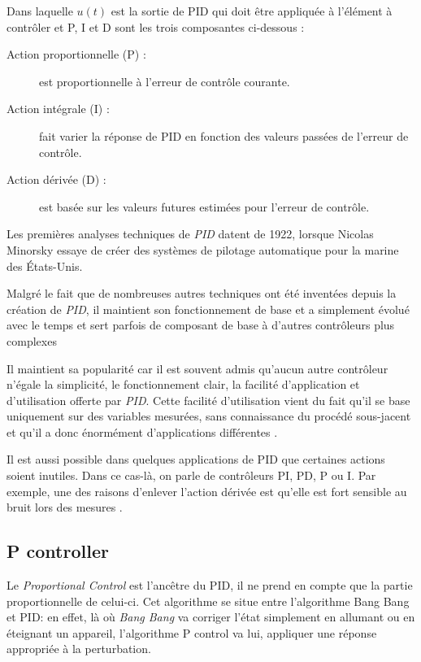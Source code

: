 \documentclass[a4paper,10pt]{report}
\begin{document}
Dans laquelle $u(t)$ est la sortie de PID qui doit être appliquée à l'élément à contrôler et P, I et D sont les trois composantes ci-dessous :
\begin{description} %
\item[Action proportionnelle (P) :]
    est proportionnelle à l'erreur de contrôle courante.
\item[Action intégrale (I) :]
    fait varier la réponse de PID en fonction des valeurs passées de l'erreur de contrôle.
\item[Action dérivée (D) :]
    est basée sur les valeurs futures estimées pour l'erreur de contrôle.
\end{description}

Les premières analyses techniques de \emph{PID} datent de 1922, lorsque Nicolas Minorsky essaye de créer des systèmes de pilotage automatique pour la marine des États-Unis. \cite{minorsky1922directional}

Malgré le fait que de nombreuses autres techniques ont été inventées depuis la création de \emph{PID}, il maintient son fonctionnement de base et a simplement évolué avec le temps et sert parfois de composant de base à d'autres contrôleurs plus complexes \cite{ang2005pid} \cite{visioli2006practical}

Il maintient sa popularité car il est souvent admis qu'aucun autre contrôleur n'égale la simplicité, le fonctionnement clair, la facilité d'application et d'utilisation offerte par \emph{PID}. Cette facilité d'utilisation vient du fait qu'il se base uniquement sur des variables mesurées, sans connaissance du procédé sous-jacent et qu'il a donc énormément d'applications différentes \cite{bennett1993history}.

Il est aussi possible dans quelques applications de PID que certaines actions soient inutiles.
Dans ce cas-là, on parle de contrôleurs PI, PD, P ou I.
Par exemple, une des raisons d'enlever l'action dérivée est qu'elle est fort sensible au bruit lors des mesures \cite{svrcek2014real}.

\subsection{P controller}
Le \emph{Proportional Control} est l'ancêtre du PID, il ne prend en compte que la partie proportionnelle de celui-ci.
Cet algorithme se situe entre l'algorithme Bang Bang et PID:
en effet, là où \emph{Bang Bang} va corriger l'état simplement en allumant ou en éteignant un appareil, l'algorithme P control va lui, appliquer une réponse appropriée à la perturbation.
\end{document}
